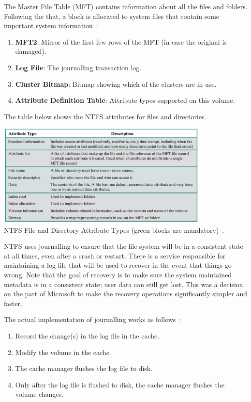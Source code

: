 The Master File Table (MFT) contains information about all the files and folders. Following the that, a block is allocated to system files that contain some important system information~\cite{osi}:

\begin{enumerate}
	\item \textbf{MFT2}: Mirror of the first few rows of the MFT (in case the original is damaged).
	\item \textbf{Log File}: The journalling transaction log.
	\item \textbf{Cluster Bitmap}: Bitmap showing which of the clusters are in use.
	\item \textbf{Attribute Definition Table}: Attribute types supported on this volume.
\end{enumerate}

The table below shows the NTFS attributes for files and directories.

\begin{center}
	\includegraphics[width=0.8\textwidth]{images/ntfs-attrs.png}\\
	NTFS File and Directory Attribute Types (green blocks are mandatory)~\cite{osi}.
\end{center}

NTFS uses journalling to ensure that the file system will be in a consistent state at all times, even after a crash or restart. There is a service responsible for maintaining a log file that will be used to recover in the event that things go wrong.  Note that the goal of recovery is to make sure the system maintained metadata is in a consistent state; user data can still get lost. This was a decision on the part of Microsoft to make the recovery operations significantly simpler and faster.

The actual implementation of journalling works as follows~\cite{russ}:

\begin{enumerate}
	\item Record the change(s) in the log file in the cache.
	\item Modify the volume in the cache.
	\item The cache manager flushes the log file to disk.
	\item Only after the log file is flushed to disk, the cache manager flushes the volume changes.
\end{enumerate}

